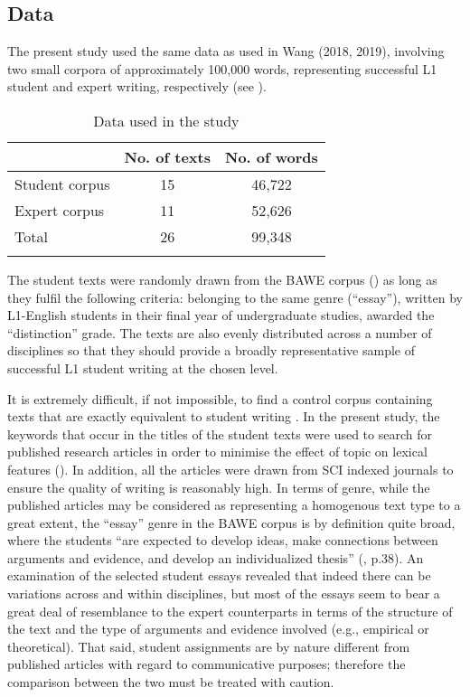 \documentclass[output=paper]{langscibook}
\begin{document}
\subsection{Data}\label{sec:wang:2.1}

The present study used the same data as used in Wang (2018, 2019), involving two small corpora of approximately 100,000 words, representing successful L1 student and expert writing, respectively (see ). 


\begin{table}
\begin{tabular}{lcc} 
\lsptoprule
& No. of texts & No. of words\\\midrule
Student corpus & 15 & 46,722\\
Expert corpus  & 11 & 52,626\\
Total          & 26 & 99,348\\
\lspbottomrule
\end{tabular}
\caption{Data used in the study\label{tab:wang:1}}
\end{table}

The student texts were randomly drawn from the BAWE corpus (\citealt{NesiGardner2012}) as long as they fulfil the following criteria: belonging to the same genre (``essay''), written by L1-English students in their final year of undergraduate studies, awarded the ``distinction'' grade. The texts are also evenly distributed across a number of disciplines so that they should provide a broadly representative sample of successful L1 student writing at the chosen level. 

It is extremely difficult, if not impossible, to find a control corpus containing texts that are exactly equivalent to student writing \citep{Callies2015}. In the present study, the keywords that occur in the titles of the student texts were used to search for published research articles in order to minimise the effect of topic on lexical features (\citealt{CainesButtery2017}). In addition, all the articles were drawn from SCI indexed journals to ensure the quality of writing is reasonably high. In terms of genre, while the published articles may be considered as representing a homogenous text type to a great extent, the ``essay'' genre in the BAWE corpus is by definition quite broad, where the students “are expected to develop ideas, make connections between arguments and evidence, and develop an individualized thesis” (\citealt{NesiGardner2012}, p.38). An examination of the selected student essays revealed that indeed there can be variations across and within disciplines, but most of the essays seem to bear a great deal of resemblance to the expert counterparts in terms of the structure of the text and the type of arguments and evidence involved (e.g., empirical or theoretical). That said, student assignments are by nature different from published articles with regard to communicative purposes; therefore the comparison between the two must be treated with caution. 
\end{document}
